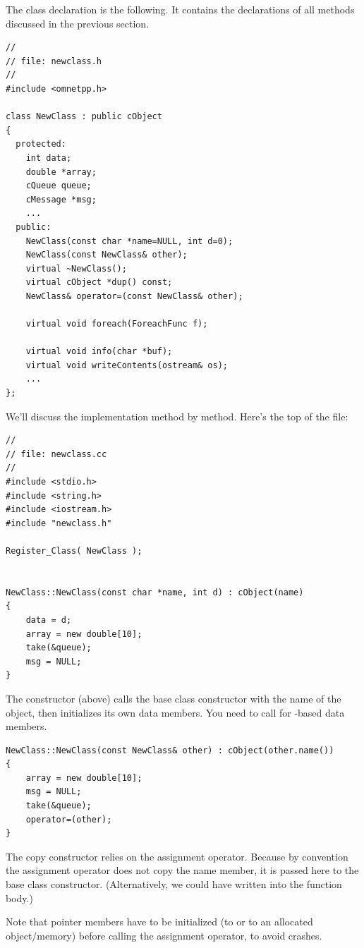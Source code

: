 The class declaration is the following. It contains the declarations
of all methods discussed in the previous section.

\begin{verbatim}
//
// file: newclass.h
//
#include <omnetpp.h>

class NewClass : public cObject
{
  protected:
    int data;
    double *array;
    cQueue queue;
    cMessage *msg;
    ...
  public:
    NewClass(const char *name=NULL, int d=0);
    NewClass(const NewClass& other);
    virtual ~NewClass();
    virtual cObject *dup() const;
    NewClass& operator=(const NewClass& other);

    virtual void foreach(ForeachFunc f);

    virtual void info(char *buf);
    virtual void writeContents(ostream& os);
    ...
};
\end{verbatim}

We'll discuss the implementation method by method.
Here's the top of the  file:

\begin{verbatim}
//
// file: newclass.cc
//
#include <stdio.h>
#include <string.h>
#include <iostream.h>
#include "newclass.h"

Register_Class( NewClass );


NewClass::NewClass(const char *name, int d) : cObject(name)
{
    data = d;
    array = new double[10];
    take(&queue);
    msg = NULL;
}
\end{verbatim}

The constructor (above) calls the base class constructor with
the name of the object, then initializes its own data members.
You need to call  for -based data members.


\begin{verbatim}
NewClass::NewClass(const NewClass& other) : cObject(other.name())
{
    array = new double[10];
    msg = NULL;
    take(&queue);
    operator=(other);
}
\end{verbatim}

The copy constructor relies on the assignment operator. Because
by convention the assignment operator does not copy the
name member, it is passed here to the base class constructor.
(Alternatively, we could have written 
into the function body.)

Note that pointer members have to be initialized (to  or to an
allocated object/memory) before calling the assignment operator,
to avoid crashes.

